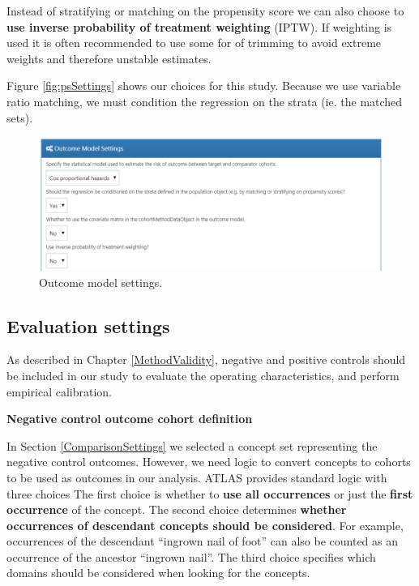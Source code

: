\documentclass[]{book}
\begin{document}
Instead of stratifying or matching on the propensity score we can also
choose to \textbf{use inverse probability of treatment weighting}
(IPTW). If weighting is used it is often recommended to use some for of
trimming to avoid extreme weights and therefore unstable estimates.

Figure \ref{fig:psSettings} shows our choices for this study. Because we
use variable ratio matching, we must condition the regression on the
strata (ie. the matched sets).

\begin{figure}

{\centering \includegraphics[width=1\linewidth]{images/PopulationLevelEstimation/outcomeModelSettings} 

}

\caption{Outcome model settings.}\label{fig:outcomeModelSettings}
\end{figure}

\subsection{Evaluation settings}\label{evaluationSettings}

As described in Chapter \ref{MethodValidity}, negative and positive
controls should be included in our study to evaluate the operating
characteristics, and perform empirical calibration.

\textbf{Negative control outcome cohort definition}

In Section \ref{ComparisonSettings} we selected a concept set
representing the negative control outcomes. However, we need logic to
convert concepts to cohorts to be used as outcomes in our analysis.
ATLAS provides standard logic with three choices The first choice is
whether to \textbf{use all occurrences} or just the \textbf{first
occurrence} of the concept. The second choice determines \textbf{whether
occurrences of descendant concepts should be considered}. For example,
occurrences of the descendant ``ingrown nail of foot'' can also be
counted as an occurrence of the ancestor ``ingrown nail''. The third
choice specifies which domains should be considered when looking for the
concepts.
\end{document}
